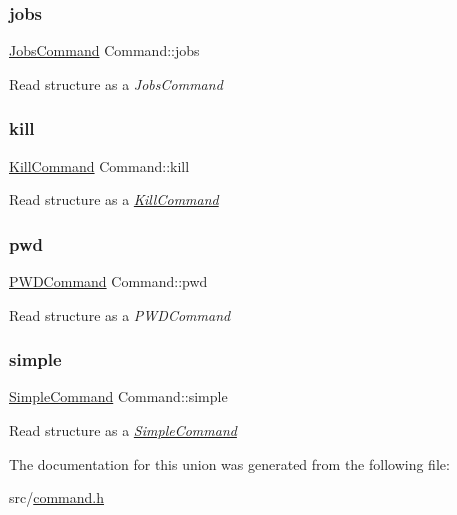 \subsubsection{\texorpdfstring{jobs}{jobs}}
{\footnotesize\ttfamily \hyperlink{command_8h_a027de4ed5fe4b0313c6c8ee0c2c1806b}{Jobs\+Command} Command\+::jobs}

Read structure as a {\itshape Jobs\+Command} \mbox{\label{unionCommand_a19c5261961f2f9a7fcbf9f5379d3f98a}} 
\subsubsection{\texorpdfstring{kill}{kill}}
{\footnotesize\ttfamily \hyperlink{structKillCommand}{Kill\+Command} Command\+::kill}

Read structure as a {\itshape \hyperlink{structKillCommand}{Kill\+Command}} \mbox{\label{unionCommand_a34fc21bb2a7fee2df4d3674b9d8166ff}} 
\subsubsection{\texorpdfstring{pwd}{pwd}}
{\footnotesize\ttfamily \hyperlink{command_8h_a0c0e44e3e2b07b1e9b48023205cb4ca2}{P\+W\+D\+Command} Command\+::pwd}

Read structure as a {\itshape P\+W\+D\+Command} \mbox{\label{unionCommand_a269da4d9b16689de14a0ec83636b59e8}} 
\subsubsection{\texorpdfstring{simple}{simple}}
{\footnotesize\ttfamily \hyperlink{structSimpleCommand}{Simple\+Command} Command\+::simple}

Read structure as a {\itshape \hyperlink{structSimpleCommand}{Simple\+Command}} 

The documentation for this union was generated from the following file\+:\begin{DoxyCompactItemize}
\item 
src/\hyperlink{command_8h}{command.\+h}\end{DoxyCompactItemize}
